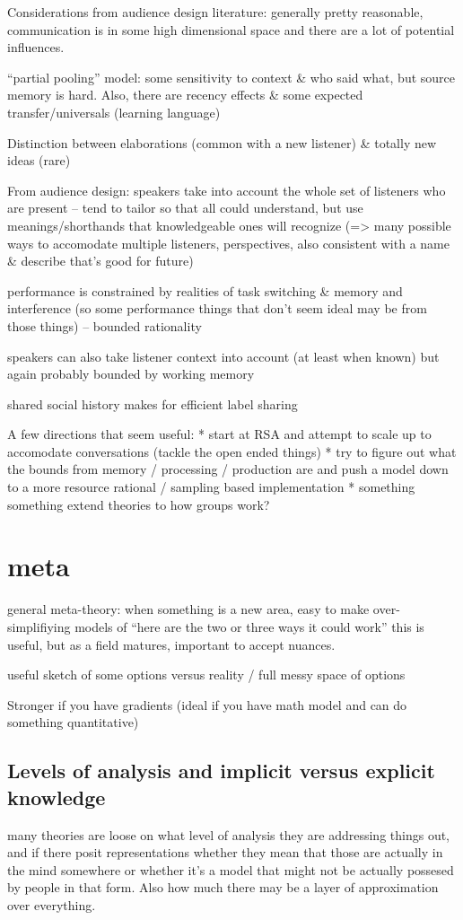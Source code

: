 \documentclass[]{article}
\begin{document}
Considerations from audience design literature: generally pretty reasonable, communication is in some high dimensional space and there are a lot of potential influences. 

``partial pooling'' model: some sensitivity to context \& who said what, but source memory is hard. Also, there are recency effects \& some expected transfer/universals (learning language) 

Distinction between elaborations (common with a new listener) \& totally new ideas (rare)

From audience design: speakers take into account the whole set of listeners who are present -- tend to tailor so that all could understand, but use meanings/shorthands that knowledgeable ones will recognize (=> many possible ways to accomodate multiple listeners, perspectives, also consistent with a name \& describe that's good for future) 

performance is constrained by realities of task switching \& memory and interference (so some performance things that don't seem ideal may be from those things) -- bounded rationality 

speakers can also take listener context into account (at least when known) but again probably bounded by working memory

shared social history makes for efficient label sharing 

A few directions that seem useful:
* start at RSA and attempt to scale up to accomodate conversations (tackle the open ended things)
* try to figure out what the bounds from memory / processing / production are and push a model down to a more resource rational / sampling based implementation
* something something extend theories to how groups work?


\section{meta}
general meta-theory: when something is a new area, easy to make over-simplifiying models of “here are the two or three ways it could work” this is useful, but as a field matures, important to accept nuances.

useful sketch of some options versus reality / full messy space of options

Stronger if you have gradients (ideal if you have math model and can do something quantitative)

\subsection{ Levels of analysis and implicit versus explicit knowledge}
many theories are loose on what level of analysis they are addressing things out, and if there posit representations whether they mean that those are actually in the mind somewhere or whether it's a model that might not be actually possesed by people in that form. Also how much there may be a layer of approximation over everything. 
\end{document}
